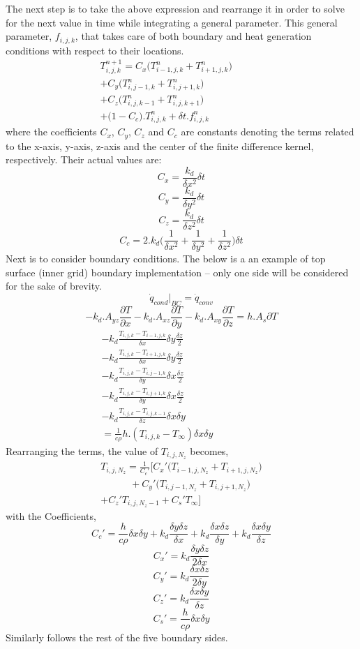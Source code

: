 \documentclass[a4paper,10pt]{IEEEtran}
\begin{document}
	The next step is to take the above expression and rearrange it in order to solve for the next value in time while integrating a general parameter. This general parameter, $f_{i,j,k}$, that takes care of both boundary and heat generation conditions with respect to their locations. 
	\begin{multline}
		T_{i,j,k}^{n+1} = C_x\Big( T_{i-1,j,k}^n+T_{i+1,j,k}^n \Big)\\ 
		+ C_y \Big( T_{i,j-1,k}^n+T_{i,j+1,k}^n \Big) \qquad \qquad \qquad \\
		 + C_z \Big( T_{i,j,k-1}^n+T_{i,j,k+1}^n \Big)\\ 
		+ \Big( 1 - C_c \Big).T_{i,j,k}^n + \delta t.f_{i,j,k}^n \quad
	\end{multline}
	where the coefficients $C_x$, $C_y$, $C_z$ and $C_c$ are constants denoting the terms related to the x-axis, y-axis, z-axis and the center of the finite difference kernel, respectively. Their actual values are:
	$$C_x = \frac{k_d}{\delta x^2} \delta t$$
	$$C_y =  \frac{k_d}{\delta y^2} \delta t$$
	$$C_z = \frac{k_d}{\delta z^2} \delta t$$
	$$C_c = 2.k_d\Big( \frac{1}{\delta x^2}+\frac{1}{\delta y^2}+\frac{1}{\delta z^2} \Big)\delta t$$
	Next is to consider boundary conditions. The below is a an example of top surface (inner grid) boundary implementation -- only one side will be considered for the sake of brevity. 
	$$\dot{q}_{cond}\Big |_{BC} = \dot{q}_{conv}$$
	$$-k_d.A_{yz} \frac{\partial T}{\partial x} -k_d.A_{xz} \frac{\partial T}{\partial y} - k_d.A_{xy} \frac{\partial T}{\partial z} = h.A_s\partial T $$
	\begin{multline}
	-k_d \frac{T_{i,j,k}-T_{i-1,j,k}}{\delta x}\delta y \frac{\delta z}{2}\\
	-k_d \frac{T_{i,j,k}-T_{i+1,j,k}}{\delta x}\delta y \frac{\delta z}{2} \qquad \qquad \qquad \qquad\\
	-k_d \frac{T_{i,j,k}-T_{i,j-1,k}}{\delta y}\delta x \frac{\delta z}{2} \qquad \qquad \qquad\\
	-k_d \frac{T_{i,j,k}-T_{i,j+1,k}}{\delta y}\delta x \frac{\delta z}{2} \qquad \qquad \\
	-k_d \frac{T_{i,j,k}-T_{i,j,k-1}}{\delta z}\delta x \delta y \qquad \\
	 = \frac{1}{c\rho}h.( T_{i,j,k}-T_{\infty})\delta x \delta y \quad \qquad
	\end{multline}
	Rearranging the terms, the value of $T_{i,j,N_z}$ becomes,
	\begin{multline}
	T_{i,j,N_z} = \frac{1}{C_c'}\Big[ C_x'\Big(T_{i-1,j,N_z}+T_{i+1,j,N_z}\Big)\\
	\qquad \quad+C_y'\Big(T_{i,j-1,N_z}+T_{i,j+1,N_z} \Big)\\
	+C_z'T_{i,j,N_z-1}+C_s'T_{\infty}\Big] 
	\end{multline}
	with the Coefficients, 
	$$C_c'=\frac{h}{c\rho}\delta x \delta y + k_d \frac{\delta y \delta z}{\delta x} + k_d \frac{\delta x \delta z}{\delta y} + k_d \frac{\delta x \delta y}{\delta z}  $$
	$$C_x'=k_d \frac{\delta y \delta z}{2\delta x} $$ 
	$$C_y'=k_d \frac{\delta x \delta z}{2\delta y} $$
	$$C_z'=k_d \frac{\delta x \delta y}{\delta z} $$
	$$C_s'= \frac{h}{c\rho}\delta x \delta y $$ 
	Similarly follows the rest of the five boundary sides.
	
\end{document}
